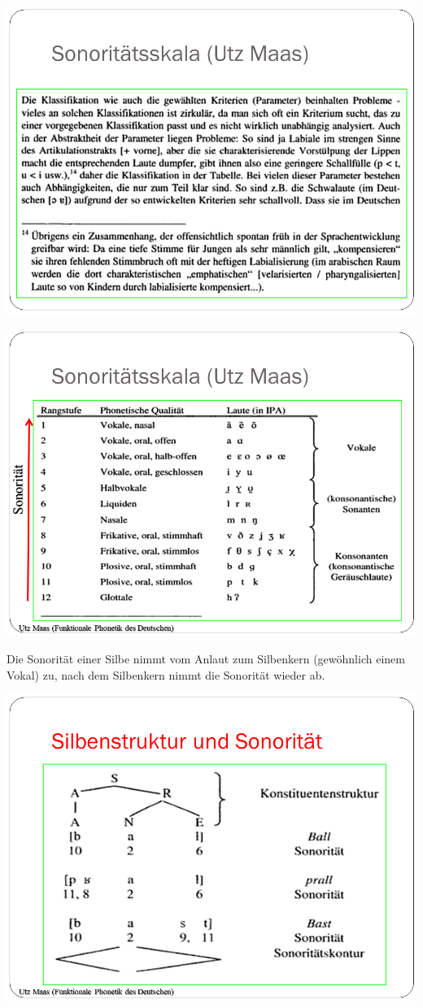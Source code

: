 \documentclass[
  letterpaper,
]{scrbook}
\begin{document}
\includegraphics[width=1\textwidth,height=\textheight]{./pictures/Wagner_Maas_Duden_Petric_6.PNG}

\includegraphics[width=1\textwidth,height=\textheight]{./pictures/Wagner_Maas_Duden_Petric_7.PNG}

Die Sonorität einer Silbe nimmt vom Anlaut zum Silbenkern (gewöhnlich
einem Vokal) zu, nach dem Silbenkern nimmt die Sonorität wieder ab.

\includegraphics[width=1\textwidth,height=\textheight]{./pictures/Wagner_Maas_Duden_Petric_8.PNG}
\end{document}
